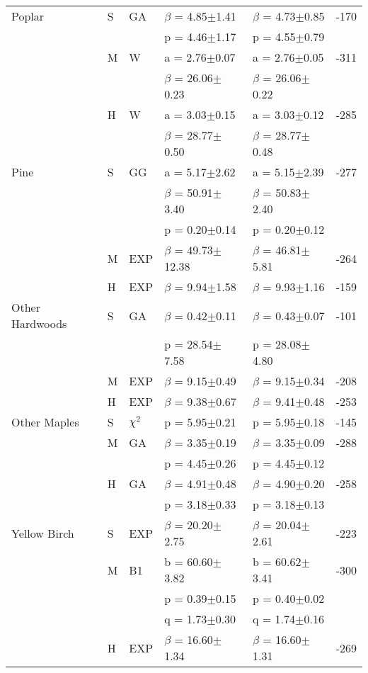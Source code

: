 \documentclass{article}
\begin{document}
\begin{table}
{\begin{tabular}{lllllr}
Poplar & S & GA & $\beta$ = 4.85$\pm$1.41 & $\beta$ = 4.73$\pm$0.85 & -170 \\
 &  &  & p = 4.46$\pm$1.17 & p = 4.55$\pm$0.79 &  \\
 & M & W & a = 2.76$\pm$0.07 & a = 2.76$\pm$0.05 & -311 \\
 &  &  & $\beta$ = 26.06$\pm$0.23 & $\beta$ = 26.06$\pm$0.22 &  \\
 & H & W & a = 3.03$\pm$0.15 & a = 3.03$\pm$0.12 & -285 \\
 &  &  & $\beta$ = 28.77$\pm$0.50 & $\beta$ = 28.77$\pm$0.48 &  \\Pine & S & GG & a = 5.17$\pm$2.62 & a = 5.15$\pm$2.39 & -277 \\
 &  &  & $\beta$ = 50.91$\pm$3.40 & $\beta$ = 50.83$\pm$2.40 &  \\
 &  &  & p = 0.20$\pm$0.14 & p = 0.20$\pm$0.12 &  \\
 & M & EXP & $\beta$ = 49.73$\pm$12.38 & $\beta$ = 46.81$\pm$5.81 & -264 \\
 & H & EXP & $\beta$ = 9.94$\pm$1.58 & $\beta$ = 9.93$\pm$1.16 & -159 \\
Other Hardwoods & S & GA & $\beta$ = 0.42$\pm$0.11 & $\beta$ = 0.43$\pm$0.07 & -101 \\
 &  &  & p = 28.54$\pm$7.58 & p = 28.08$\pm$4.80 &  \\
 & M & EXP & $\beta$ = 9.15$\pm$0.49 & $\beta$ = 9.15$\pm$0.34 & -208 \\
 & H & EXP & $\beta$ = 9.38$\pm$0.67 & $\beta$ = 9.41$\pm$0.48 & -253 \\
Other Maples & S & $\chi^2$ & p = 5.95$\pm$0.21 & p = 5.95$\pm$0.18 & -145 \\
 & M & GA & $\beta$ = 3.35$\pm$0.19 & $\beta$ = 3.35$\pm$0.09 & -288 \\
 &  &  & p = 4.45$\pm$0.26 & p = 4.45$\pm$0.12 &  \\
 & H & GA & $\beta$ = 4.91$\pm$0.48 & $\beta$ = 4.90$\pm$0.20 & -258 \\
 &  &  & p = 3.18$\pm$0.33 & p = 3.18$\pm$0.13 &  \\
Yellow Birch & S & EXP & $\beta$ = 20.20$\pm$2.75 & $\beta$ = 20.04$\pm$2.61 & -223 \\
 & M & B1 & b = 60.60$\pm$3.82 & b = 60.62$\pm$3.41 & -300 \\
 &  &  & p = 0.39$\pm$0.15 & p = 0.40$\pm$0.02 &  \\
 &  &  & q = 1.73$\pm$0.30 & q = 1.74$\pm$0.16 &  \\
 & H & EXP & $\beta$ = 16.60$\pm$1.34 & $\beta$ = 16.60$\pm$1.31 & -269 \\

\end{tabular}}
\end{table}
\end{document}
